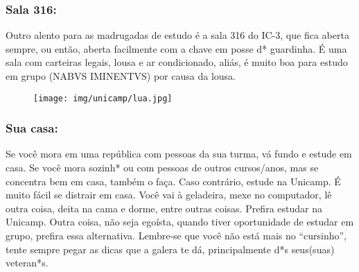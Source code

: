 \subsubsection{Sala 316:} Outro alento para as madrugadas de estudo é a sala 316
do IC-3, que fica aberta sempre, ou então, aberta facilmente com a chave em
posse d* guardinha. É uma sala com carteiras legais, lousa e ar condicionado,
aliás, é muito boa para estudo em grupo (NABVS IMINENTVS) por causa da lousa.

\begin{figure}[h!]  \centering
  \texttt{[image: img/unicamp/lua.jpg]}
\end{figure}

\subsubsection{Sua casa:} Se você mora em uma república com pessoas da sua
turma, vá fundo e estude em casa. Se você mora sozinh* ou com pessoas de outros
cursos/anos, mas se concentra bem em casa, também o faça. Caso contrário, estude
na Unicamp. É muito fácil se distrair em casa. Você vai à geladeira, mexe no
computador, lê outra coisa, deita na cama e dorme, entre outras coisas. Prefira
estudar na Unicamp. Outra coisa, não seja egoísta, quando tiver oportunidade de
estudar em grupo, prefira essa alternativa. Lembre-se que você não está mais no
``cursinho'', tente sempre pegar as dicas que a galera te dá, principalmente d*s
seus(suas) veteran*s.


